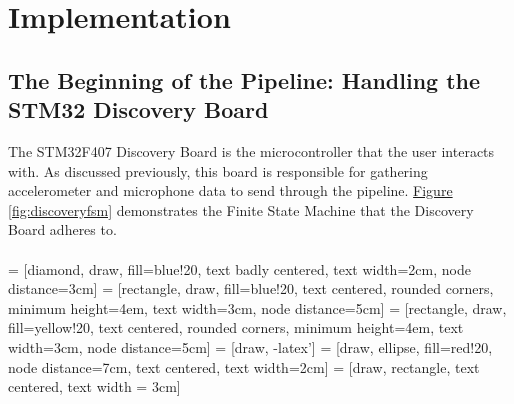 \section{Implementation}

\subsection{The Beginning of the Pipeline: Handling the STM32 Discovery Board}
The STM32F407 Discovery Board is the microcontroller that the user interacts with. As discussed
previously, this board is responsible for gathering accelerometer and microphone data to send
through the pipeline. \hyperref[fig:discoveryfsm]{Figure \ref{fig:discoveryfsm}} demonstrates the
Finite State Machine that the Discovery Board adheres to.\\\\
 = [diamond, draw, fill=blue!20, text badly centered, text width=2cm, node
distance=3cm]
 = [rectangle, draw, fill=blue!20, text centered, rounded corners, minimum
height=4em, text width=3cm, node distance=5cm]
 = [rectangle, draw, fill=yellow!20, text centered, rounded corners, minimum
height=4em, text width=3cm, node distance=5cm]
 = [draw, -latex']
 = [draw, ellipse, fill=red!20, node distance=7cm, text centered, text width=2cm]
 = [draw, rectangle, text centered, text width = 3cm]
